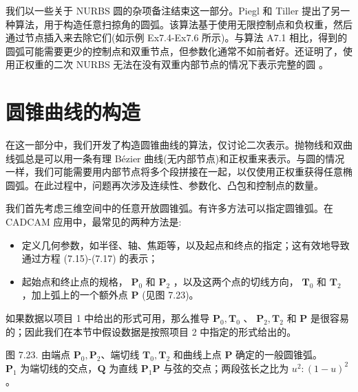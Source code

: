 \documentclass[../main.tex]{subfiles}
\begin{document}
我们以一些关于 NURBS 圆的杂项备注结束这一部分。Piegl 和 Tiller \cite{Pieg89b} 提出了另一种算法，用于构造任意扫掠角的圆弧。该算法基于使用无限控制点和负权重，然后通过节点插入来去除它们(如示例 Ex7.4-Ex7.6 所示)。与算法 A7.1 相比，得到的圆弧可能需要更少的控制点和双重节点，但参数化通常不如前者好。还证明了，使用正权重的二次 NURBS 无法在没有双重内部节点的情况下表示完整的圆 \cite{Pieg89b}。






\section{圆锥曲线的构造}
在这一部分中，我们开发了构造圆锥曲线的算法，仅讨论二次表示。抛物线和双曲线弧总是可以用一条有理 Bézier 曲线(无内部节点)和正权重来表示。与圆的情况一样，我们可能需要用内部节点将多个段拼接在一起，以仅使用正权重获得任意椭圆弧。在此过程中，问题再次涉及连续性、参数化、凸包和控制点的数量。

我们首先考虑三维空间中的任意开放圆锥弧。有许多方法可以指定圆锥弧。在 CADCAM 应用中，最常见的两种方法是:

\begin{itemize}
\item 定义几何参数，如半径、轴、焦距等，以及起点和终点的指定；这有效地导致通过方程 (7.15)-(7.17) 的表示；
\end{itemize}

\begin{itemize}
\item 起始点和终止点的规格， \({\mathbf{P}}_{0}\) 和 \({\mathbf{P}}_{2}\) ，以及这两个点的切线方向， \({\mathbf{T}}_{0}\) 和 \({\mathbf{T}}_{2}\) ，加上弧上的一个额外点 \(\mathbf{P}\) (见图 7.23)。
\end{itemize}

如果数据以项目 1 中给出的形式可用，那么推导 \({\mathbf{P}}_{0},{\mathbf{T}}_{0}\) 、 \({\mathbf{P}}_{2},{\mathbf{T}}_{2}\) 和 \(\mathbf{P}\) 是很容易的；因此我们在本节中假设数据是按照项目 2 中指定的形式给出的。



\begin{center}
\begin{minipage}{19cm}
\vspace*{.6\baselineskip}
\centering
{}
\par\smallskip
图 7.23. 由端点 $\mathbf P_0,\mathbf P_2$、端切线 $\mathbf T_0,\mathbf T_2$ 和曲线上点 $\mathbf P$ 确定的一般圆锥弧。\\
$\mathbf P_1$ 为端切线的交点，$\mathbf Q$ 为直线 $\mathbf P_1\mathbf P$ 与弦的交点；两段弦长之比为 $u^2:(1-u)^2$。
\end{minipage}
\end{center}
\end{document}
